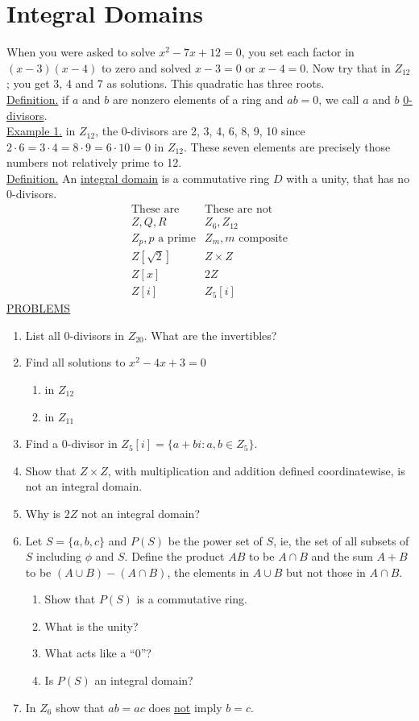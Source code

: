 \documentclass[12pt]{book}
\theoremstyle{definition}
\begin{document}
\section{Integral Domains}

\quad When you were asked to solve $x^2-7x+12=0$, you set each factor in $(x-3)(x-4)$ to zero and solved $x-3=0$ or $x-4=0$.  Now try that in $Z_{12}$; you get 3, 4 and 7 as solutions.  This quadratic has three roots.\\
\underline{Definition.} if $a$ and $b$ are nonzero elements of a ring and $ab=0$, we call $a$ and $b$ \underline{0-divisors}.\\[.1in]
\underline{Example 1.} in $Z_{12}$, the 0-divisors are 2, 3, 4, 6, 8, 9, 10 since $2\cdot6=3\cdot4=8\cdot9=6\cdot10=0$ in $Z_{12}$.  These seven elements are precisely those numbers not relatively prime to 12.\\[.1in]
%
\underline{Definition.} An \underline{integral domain} is a commutative ring $D$ with a unity, that has no 0-divisors.
$$\begin{array}{c|c}
\text{These are} & \text{These are not}\\
\hline
Z,Q,R & Z_6, Z_{12}\\
Z_p, p \text{ a prime} & Z_m, m\text{ composite}\\
Z[\sqrt2] & Z\times Z\\
Z[x] & 2Z\\
Z[i] &  Z_5[i]
\end{array}$$
\underline{PROBLEMS}
\begin{enumerate}
\item List all 0-divisors in $Z_{20}$.  What are the invertibles?
\item Find all solutions to $x^2-4x+3=0$
\begin{enumerate}
\item in $Z_{12}$
\item in $Z_{11}$
\end{enumerate}
\item Find a 0-divisor in $Z_5[i]=\{a+bi:a,b\in Z_5\}$.
\item Show that $Z\times Z$, with multiplication and addition defined coordinatewise, is not an integral domain.
\item Why is $2Z$ not an integral domain?
\item Let $S=\{a,b,c\}$ and $P(S)$ be the power set of $S$, ie, the set of all subsets of $S$ including $\phi$ and $S$.  Define the product $AB$ to be $A\cap B$ and the sum $A+B$ to be $(A\cup B)-(A\cap B)$, the elements in $A\cup B$ but not those in $A\cap B$.
\begin{enumerate}
\item Show that $P(S)$ is a commutative ring.
\item What is the unity?
\item What acts like a ``0''?
\item Is $P(S)$ an integral domain?
\end{enumerate}
\item In $Z_6$ show that $ab=ac$ does \underline{not} imply $b=c$.
\end{enumerate}
\end{document}
